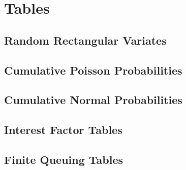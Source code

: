 \chapter{Tables}

\section{Random Rectangular Variates}


\section{Cumulative Poisson Probabilities}


\section{Cumulative Normal Probabilities}


\section{Interest Factor Tables}


\section{Finite Queuing Tables}